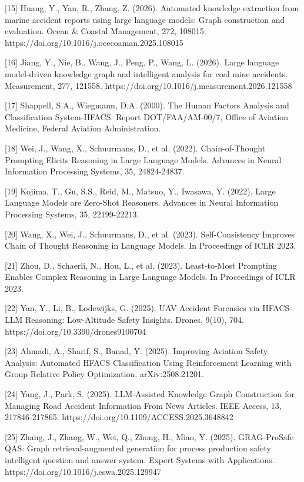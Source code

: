 \documentclass[11pt]{article}
\begin{document}
[15] Huang, Y., Yan, R., Zhang, Z. (2026). Automated knowledge extraction from marine accident reports using large language models: Graph construction and evaluation. Ocean \& Coastal Management, 272, 108015. https://doi.org/10.1016/j.ocecoaman.2025.108015

[16] Jiang, Y., Nie, B., Wang, J., Peng, P., Wang, L. (2026). Large language model-driven knowledge graph and intelligent analysis for coal mine accidents. Measurement, 277, 121558. https://doi.org/10.1016/j.measurement.2026.121558

[17] Shappell, S.A., Wiegmann, D.A. (2000). The Human Factors Analysis and Classification System-HFACS. Report DOT/FAA/AM-00/7, Office of Aviation Medicine, Federal Aviation Administration.

[18] Wei, J., Wang, X., Schuurmans, D., et al. (2022). Chain-of-Thought Prompting Elicits Reasoning in Large Language Models. Advances in Neural Information Processing Systems, 35, 24824-24837.

[19] Kojima, T., Gu, S.S., Reid, M., Matsuo, Y., Iwasawa, Y. (2022). Large Language Models are Zero-Shot Reasoners. Advances in Neural Information Processing Systems, 35, 22199-22213.

[20] Wang, X., Wei, J., Schuurmans, D., et al. (2023). Self-Consistency Improves Chain of Thought Reasoning in Language Models. In Proceedings of ICLR 2023.

[21] Zhou, D., Schaerli, N., Hou, L., et al. (2023). Least-to-Most Prompting Enables Complex Reasoning in Large Language Models. In Proceedings of ICLR 2023.

[22] Yan, Y., Li, B., Lodewijks, G. (2025). UAV Accident Forensics via HFACS-LLM Reasoning: Low-Altitude Safety Insights. Drones, 9(10), 704. https://doi.org/10.3390/drones9100704

[23] Ahmadi, A., Sharif, S., Banad, Y. (2025). Improving Aviation Safety Analysis: Automated HFACS Classification Using Reinforcement Learning with Group Relative Policy Optimization. arXiv:2508.21201.

[24] Yang, J., Park, S. (2025). LLM-Assisted Knowledge Graph Construction for Managing Road Accident Information From News Articles. IEEE Access, 13, 217846-217865. https://doi.org/10.1109/ACCESS.2025.3648842

[25] Zhang, J., Zhang, W., Wei, Q., Zhong, H., Miao, Y. (2025). GRAG-ProSafe QAS: Graph retrieval-augmented generation for process production safety intelligent question and answer system. Expert Systems with Applications. https://doi.org/10.1016/j.eswa.2025.129947
\end{document}
